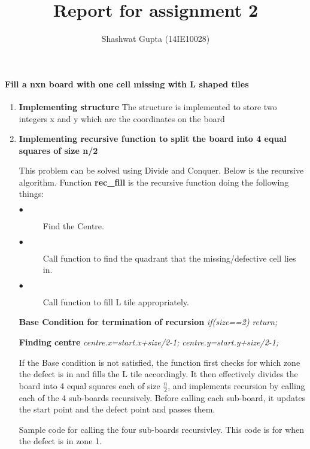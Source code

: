 \documentclass[a4paper,11pt]{article}
\title{Report for assignment 2}
\author{Shashwat Gupta (14IE10028)}
\begin{document}
\maketitle

\paragraph{Fill a nxn board with one cell missing with L shaped tiles}
\begin{enumerate}
\item \textbf{Implementing structure}
The structure is implemented to store two integers x and y which are the coordinates on the board

\item \textbf{Implementing recursive function to split the board into 4 equal squares of size n/2}

This problem can be solved using Divide and Conquer. Below is the recursive algorithm.
Function \textbf{rec\_fill} is the recursive function doing the following things:
\begin{description}
 \item[$\bullet$] Find the Centre.
 \item[$\bullet$] Call function to find the quadrant that the missing/defective cell lies in.
 \item[$\bullet$] Call function to fill L tile appropriately.
\end{description}

\textbf{Base Condition for termination of recursion} \newline
\emph{	if(size==2)} \newline
\emph{	return;}

\textbf{Finding centre} \newline
\emph{	centre.x=start.x+size/2-1;}\newline
\emph{	centre.y=start.y+size/2-1;}

If the Base condition is not satisfied, the function first checks for which zone the defect is in and fills the L tile accordingly.
It then effectively divides the board into 4 equal squares each of size $\frac{n}{2}$, and implements recursion by calling each of the 4 sub-boards recursively.
Before calling each sub-board, it updates the start point and the defect point and passes them.

Sample code for calling the four sub-boards recursivley. This code is for when the defect is in zone 1.


\end{enumerate}
\end{document}
